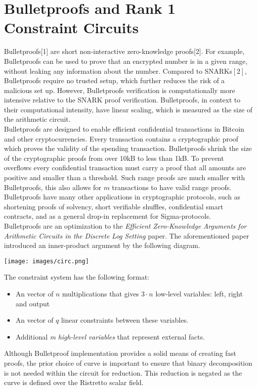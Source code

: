 \documentclass{article}
\begin{document}
\section{Bulletproofs and Rank 1 Constraint Circuits} 
Bulletproofs[1] are short non-interactive zero-knowledge proofs[2]. For example, Bulletproofs can be used to prove that an encrypted number is in a given range, without leaking any information about the number. Compared to SNARKs$[2]$, Bulletproofs require no trusted setup, which further reduces the risk of a malicious set up. However, Bulletproofs verification is computationally more intensive relative to the SNARK proof verification. Bulletproofs, in context to their computational intensity, have linear scaling, which is measured as the size of the arithmetic circuit.\\
Bulletproofs are designed to enable efficient confidential transactions in Bitcoin and other cryptocurrencies. Every transaction contains a cryptographic proof which proves the validity of the spending transaction. Bulletproofs shrink the size of the cryptographic proofs from over 10kB to less than 1kB. To prevent overflows every confidential transaction must carry a proof that all amounts are positive and smaller than a threshold. Such range proofs are much smaller with Bulletproofs, this also allows for $m$ transactions to have valid range proofs. \\
Bulletproofs have many other applications in cryptographic protocols, such as shortening proofs of solvency, short verifiable shuffles, confidential smart contracts, and as a general drop-in replacement for Sigma-protocols. \\
Bulletproofs are an optimization to the \emph{Efficient Zero-Knowledge Arguments for
Arithmetic Circuits in the Discrete Log Setting} paper. The aforementioned paper introduced an inner-product argument by the following diagram.
\begin{center}
\texttt{[image: images/circ.png]}
\end{center}
The constraint system has the following format: 
\begin{itemize}
    \item  An vector of $n$ multiplications that gives $3 \cdot n$ low-level variables: left, right and output
    \item An vector of $q$ linear constraints between these variables.
    \item Additional \emph{m high-level variables} that represent external facts.
\end{itemize} 
 Although Bulletproof implementation provides a solid means of creating fast proofs, the prior choice of curve is important to ensure that binary decomposition is not needed within the circuit for reduction. This reduction is negated as the curve is defined over the Ristretto scalar field.  
\end{document}

